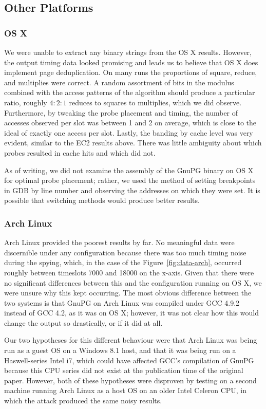 \documentclass[11pt]{llncs}
\begin{document}
\subsection{Other Platforms}

\subsubsection{OS X}

We were unable to extract any binary strings from the OS X results. However,
the output timing data looked promising and leads us to believe that OS X does
implement page deduplication. On many runs the
proportions of square, reduce, and multiplies were correct. A random assortment
of bits in the modulus combined with the access patterns of the algorithm should
produce a particular ratio, roughly $4:2:1$ reduces to squares to multiplies,
which we did observe. Furthermore, by tweaking the probe placement and
timing, the number of accesses observed per slot was between 1 and 2 on average,
which is close to the ideal of exactly one access per slot. Lastly, the banding
by cache level was very evident, similar to the EC2 results above. There was
little ambiguity about which probes resulted in cache hits and which did not.

As of writing, we did not examine the assembly of the GnuPG binary on OS X for
optimal probe placement; rather, we used the method of setting breakpoints in
GDB by line number and observing the addresses on which they were set. It is
possible that switching methods would produce better results.

\subsubsection{Arch Linux}

Arch Linux provided the poorest results by far. No meaningful data were
discernible under any configuration because there was too much timing noise
during the spying, which, in the case of the Figure~\ref{fig:data-arch},
occurred roughly between timeslots 7000 and 18000 on the x-axis. Given that
there were no significant differences between this and the configuration running
on OS X, we were unsure why this kept occurring. The most obvious difference
between the two systems is that GnuPG on Arch Linux was compiled under GCC 4.9.2
instead of GCC 4.2, as it was on OS X; however, it was not clear how this would
change the output so drastically, or if it did at all.

Our two hypotheses for this different behaviour were that Arch Linux
was being run as a guest OS on a Windows 8.1 host, and that it was being run on
a Haswell-series Intel i7, which could have affected GCC's compilation of GnuPG
because this CPU series
did not exist at the publication time of the original paper.  However, both of
these hypotheses were disproven by testing on a second machine running Arch
Linux as a host OS on an older Intel Celeron CPU, in which the attack produced
the same noisy results.
\end{document}
